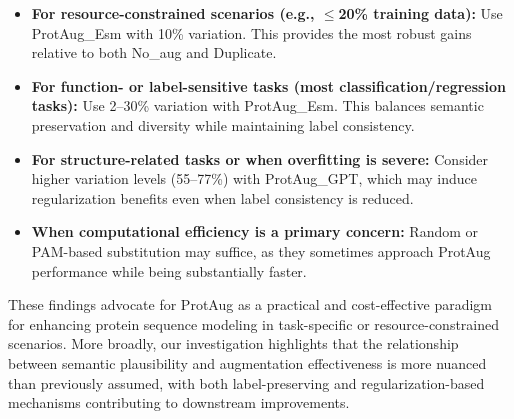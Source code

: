 \documentclass{article}
\begin{document}
\begin{itemize}
    \item \textbf{For resource-constrained scenarios (e.g., $\le$20\% training data):} Use ProtAug\_Esm with 10\% variation. This provides the most robust gains relative to both No\_aug and Duplicate.
    \item \textbf{For function- or label-sensitive tasks (most classification/regression tasks):} Use 2–30\% variation with ProtAug\_Esm. This balances semantic preservation and diversity while maintaining label consistency.
    \item \textbf{For structure-related tasks or when overfitting is severe:} Consider higher variation levels (55–77\%) with ProtAug\_GPT, which may induce regularization benefits even when label consistency is reduced.
    \item \textbf{When computational efficiency is a primary concern:} Random or PAM-based substitution may suffice, as they sometimes approach ProtAug performance while being substantially faster.
\end{itemize}

These findings advocate for ProtAug as a practical and cost-effective paradigm for enhancing protein sequence modeling in task-specific or resource-constrained scenarios. More broadly, our investigation highlights that the relationship between semantic plausibility and augmentation effectiveness is more nuanced than previously assumed, with both label-preserving and regularization-based mechanisms contributing to downstream improvements.

\appendix




\end{document}
